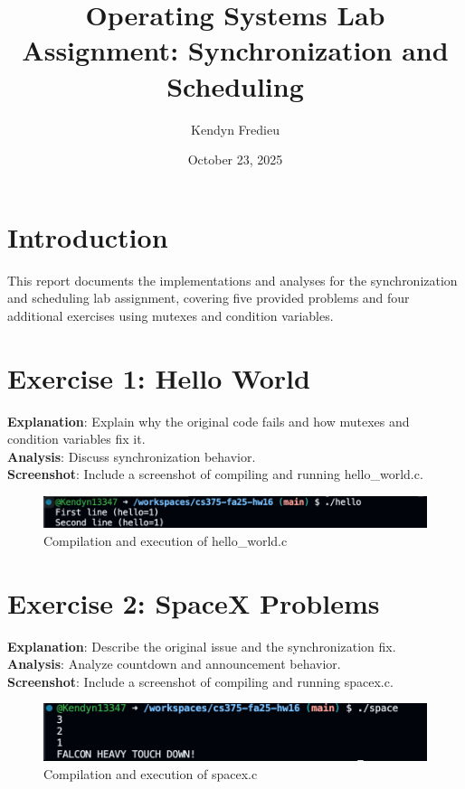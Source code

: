 \documentclass{article}
\begin{document}
\title{Operating Systems Lab Assignment: Synchronization and Scheduling}
\author{Kendyn Fredieu}
\date{October 23, 2025}
\maketitle

\section{Introduction}
This report documents the implementations and analyses for the synchronization and scheduling lab assignment, covering five provided problems and four additional exercises using mutexes and condition variables.

\section{Exercise 1: Hello World}

\textbf{Explanation}: Explain why the original code fails and how mutexes and condition variables fix it.\\
\textbf{Analysis}: Discuss synchronization behavior.\\
\textbf{Screenshot}: Include a screenshot of compiling and running hello\_world.c.
\begin{figure}[H]
    \centering
    \includegraphics[width=\textwidth]{hello_world.png}
    \caption{Compilation and execution of hello\_world.c}
\end{figure}

\section{Exercise 2: SpaceX Problems}

\textbf{Explanation}: Describe the original issue and the synchronization fix.\\
\textbf{Analysis}: Analyze countdown and announcement behavior.\\
\textbf{Screenshot}: Include a screenshot of compiling and running spacex.c.
\begin{figure}[H]
    \centering
    \includegraphics[width=\textwidth]{spacex.png}
    \caption{Compilation and execution of spacex.c}
\end{figure}
\end{document}
